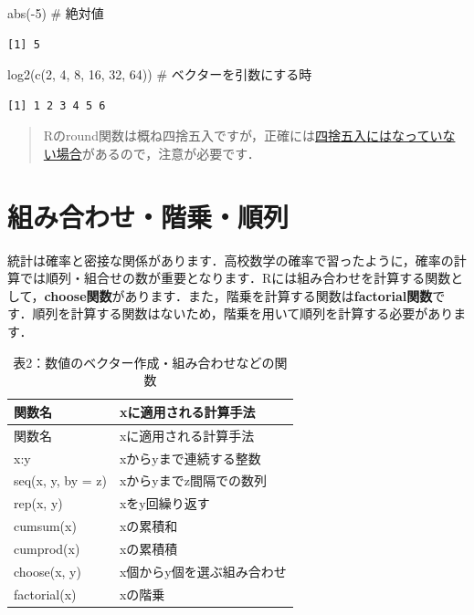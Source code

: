 \documentclass[
  letterpaper,
  DIV=11,
  numbers=noendperiod]{scrreprt}
\newenvironment{Shaded}{\begin{snugshade}}{\end{snugshade}}
\newcommand{\CommentTok}[1]{\textcolor[rgb]{0.37,0.37,0.37}{#1}}
\newcommand{\DecValTok}[1]{\textcolor[rgb]{0.68,0.00,0.00}{#1}}
\newcommand{\FunctionTok}[1]{\textcolor[rgb]{0.28,0.35,0.67}{#1}}
\newcommand{\NormalTok}[1]{\textcolor[rgb]{0.00,0.23,0.31}{#1}}
\newcommand{\SpecialCharTok}[1]{\textcolor[rgb]{0.37,0.37,0.37}{#1}}
\begin{document}
\begin{Shaded}
\begin{Highlighting}[]
\FunctionTok{abs}\NormalTok{(}\SpecialCharTok{{-}}\DecValTok{5}\NormalTok{) }\CommentTok{\# 絶対値}
\end{Highlighting}
\end{Shaded}

\begin{verbatim}
[1] 5
\end{verbatim}

\begin{Shaded}
\begin{Highlighting}[]
\FunctionTok{log2}\NormalTok{(}\FunctionTok{c}\NormalTok{(}\DecValTok{2}\NormalTok{, }\DecValTok{4}\NormalTok{, }\DecValTok{8}\NormalTok{, }\DecValTok{16}\NormalTok{, }\DecValTok{32}\NormalTok{, }\DecValTok{64}\NormalTok{)) }\CommentTok{\# ベクターを引数にする時}
\end{Highlighting}
\end{Shaded}

\begin{verbatim}
[1] 1 2 3 4 5 6
\end{verbatim}

\begin{quote}
Rのround関数は概ね四捨五入ですが，正確には\href{https://www.atleaf.co.jp/column.html?pageId=45}{四捨五入にはなっていない場合}があるので，注意が必要です．
\end{quote}

\hypertarget{ux7d44ux307fux5408ux308fux305bux968eux4e57ux9806ux5217}{%
\section{組み合わせ・階乗・順列}\label{ux7d44ux307fux5408ux308fux305bux968eux4e57ux9806ux5217}}

統計は確率と密接な関係があります．高校数学の確率で習ったように，確率の計算では順列・組合せの数が重要となります．Rには組み合わせを計算する関数として，\textbf{choose関数}があります．また，階乗を計算する関数は\textbf{factorial関数}です．順列を計算する関数はないため，階乗を用いて順列を計算する必要があります．

\begin{longtable}[]{@{}ll@{}}
\caption{表2：数値のベクター作成・組み合わせなどの関数}\tabularnewline
\toprule()
関数名 & xに適用される計算手法 \\
\midrule()
\endfirsthead
\toprule()
関数名 & xに適用される計算手法 \\
\midrule()
\endhead
x:y & xからyまで連続する整数 \\
seq(x, y, by = z) & xからyまでz間隔での数列 \\
rep(x, y) & xをy回繰り返す \\
cumsum(x) & xの累積和 \\
cumprod(x) & xの累積積 \\
choose(x, y) & x個からy個を選ぶ組み合わせ \\
factorial(x) & xの階乗 \\
\bottomrule()
\end{longtable}
\end{document}
